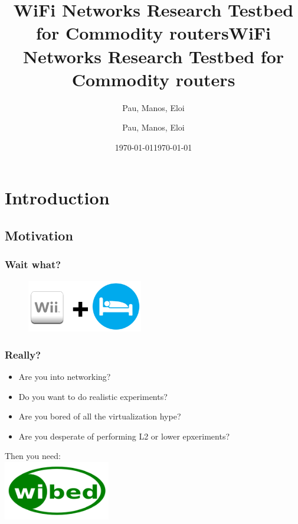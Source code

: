 \documentclass[usepdftitle=false,13pt]{beamer}
\title[WiFi Networks Research Testbed for Commodity routers]{WiFi Networks Research Testbed for Commodity routers}
\author[{Pau, Manos, Eloi}]{Pau, Manos, Eloi}
\institute[{UPC, Guifi}]{UPC, Guifi}
\date[\today]{\today}
\begin{document}
\title[WiBed\hspace{20em}\insertframenumber/\inserttotalframenumber]{WiFi Networks Research Testbed for Commodity routers}  
\author[Pau@Guifi,\{Manos,Eloi\}@UPC ]{ Pau, Manos, Eloi\\
 }

\date{\today} 

\frame{\titlepage}




\section{Introduction}
\subsection{Motivation}

\begin{frame}\frametitle{Wait what?}

\begin{figure}[h!]
\begin{center}
\includegraphics[width=0.45\textwidth]{pic/Wiibed}
\end{center}
\end{figure}

\end{frame}



\begin{frame}\frametitle{Really?}

	\begin{itemize}
		\item Are you into networking?
		\pause
		\item Do you want to do realistic experiments?
		\pause
		\item Are you bored of all the virtualization hype?
		\pause
		\item Are you desperate of performing L2 or lower epxeriments?
	\end{itemize}
	\pause
	\begin{center}
	Then you need:\\
	\includegraphics[width=0.35\textwidth]{pic/wibed-logo}
	\end{center}

\end{frame}
\end{document}
